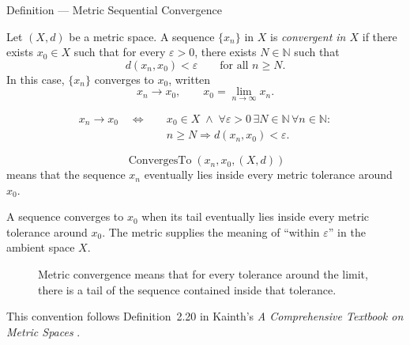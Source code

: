 \begin{definitionbox}{Definition --- Metric Sequential Convergence}
\begin{definition}
\label{def:metric-sequential-convergence}
Let \((X,d)\) be a metric space.  A sequence \(\{x_n\}\) in \(X\) is
\emph{convergent in \(X\)} if there exists \(x_0\in X\) such that for every
\(\varepsilon>0\), there exists \(N\in\mathbb{N}\) such that
\[
  d(x_n,x_0)<\varepsilon
  \qquad\text{for all } n\geq N.
\]
In this case, \(\{x_n\}\) converges to \(x_0\), written
\[
  x_n\to x_0,
  \qquad
  x_0=\lim_{n\to\infty}x_n.
\]
\end{definition}
\end{definitionbox}

\begin{remark*}
\[
\begin{aligned}
x_n\to x_0
\quad\Longleftrightarrow\quad
&x_0\in X
\;\land\;
\forall\varepsilon>0\,\exists N\in\mathbb{N}\,\forall n\in\mathbb{N}{:}
\\
&n\geq N
\Longrightarrow
d(x_n,x_0)<\varepsilon.
\end{aligned}
\]
\end{remark*}

\begin{remark*}
\[
\operatorname{ConvergesTo}(x_n,x_0,(X,d))
\]
means that the sequence \(x_n\) eventually lies inside every metric tolerance
around \(x_0\).
\end{remark*}

\begin{remark*}[Interpretation]
A sequence converges to \(x_0\) when its tail eventually lies inside every
metric tolerance around \(x_0\).  The metric supplies the meaning of
``within \(\varepsilon\)'' in the ambient space \(X\).
\end{remark*}

\begin{figure}[htbp]
\centering

\caption{Metric convergence means that for every tolerance around the limit,
there is a tail of the sequence contained inside that tolerance.}
\label{fig:sequential-convergence-tail}
\end{figure}

\begin{remark*}
This convention follows Definition~2.20 in Kainth's
\emph{A Comprehensive Textbook on Metric Spaces}
\cite{KainthComprehensiveMetricSpaces2023}.
\end{remark*}

